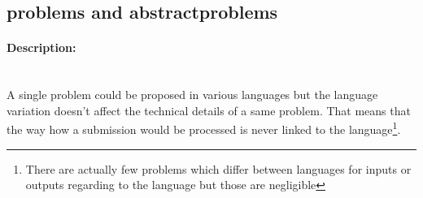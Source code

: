 \documentclass[../main.tex]{subfiles}
\begin{document}

\newpage
\subsection{problems and abstractproblems} %
\label{sub:problems}
\begin{figure}
  \vspace{-20pt}
  \begin{center}
  \end{center}
  \vspace{-10pt}
\end{figure}

\paragraph{Description:}~\\ %
A single problem could be proposed in various languages but the language variation doesn't affect the technical details of a same problem. That means that the way how a submission would be processed is never linked to the language\footnote{There are actually few problems which differ between languages for inputs or outputs regarding to the language but those are negligible}.

\begin{figure}
  \vspace{-20pt}
  \begin{center}
  \end{center}
  \vspace{-20pt}
\end{figure}
\end{document}
